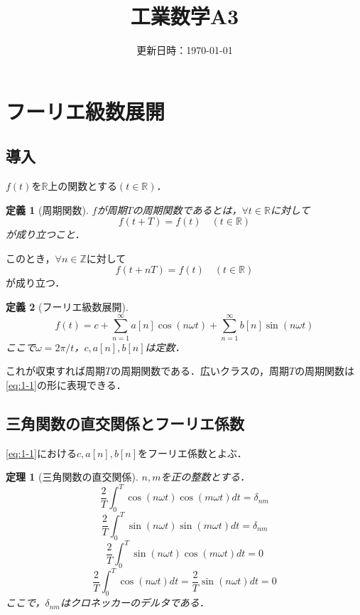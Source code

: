 \documentclass[dvipdfmx,a4j,10pt]{jsarticle}
\title{工業数学A3}
\author{}
\date{更新日時：\today}%
\theoremstyle{mystyle1}
\newtheorem{theorem}[definition]{定理}
\theoremstyle{mystyle3}
\theoremstyle{mystyle4}
\theoremstyle{mystyle2}
\newtheorem{dfn*}{定義}
\newenvironment{thm}[1][]
{\begin{tcolorbox}[
    enhanced,
    boxrule=0pt,
    arc=0mm,
    frame hidden,
    borderline west={2pt}{-4pt}{red},
    breakable = true
    ]
    \begin{theorem}[#1]
}
{\end{theorem}\end{tcolorbox}}
\begin{document}
\maketitle
\tableofcontents%

\newpage

\section{フーリエ級数展開}

\subsection{導入}

$f(t)$を$\mathbb{R}$上の関数とする$(t\in\mathbb{R})$．

\begin{dfn*}[周期関数]
    $f$が周期$T$の周期関数であるとは，$\forall t\in\mathbb{R}$に対して
    \[
        f(t+T)=f(t)\quad(t\in\mathbb{R})
    \]
    が成り立つこと．
\end{dfn*}
このとき，$\forall n\in\mathbb{Z}$に対して
\[
    f(t+nT)=f(t)\quad(t\in\mathbb{R})
\]
が成り立つ．

\begin{dfn*}[フーリエ級数展開]
    \begin{equation}\label{eq:1-1}
        f(t)=c+\sum_{n=1}^\infty a[n]\cos(n\omega t)+\sum_{n=1}^\infty b[n]\sin(n\omega t)
    \end{equation}
    ここで$\omega=2\pi/t$，$c,a[n],b[n]$は定数．
\end{dfn*}

これが収束すれば周期$T$の周期関数である．広いクラスの，周期$T$の周期関数は\eqref{eq:1-1}の形に表現できる．

\subsection{三角関数の直交関係とフーリエ係数}

\eqref{eq:1-1}における$c,a[n],b[n]$をフーリエ係数とよぶ．

\begin{thm}[三角関数の直交関係]\label{thm:1-1}
    $n,m$を正の整数とする．
    \begin{equation}\label{eq:1-2}
        \frac{2}{T}\int_0^T\cos(n\omega t)\cos(m\omega t) dt=\delta_{nm}
    \end{equation}
    \begin{equation}\label{eq:1-3}
        \frac{2}{T}\int_0^T\sin(n\omega t)\sin(m\omega t) dt=\delta_{nm}
    \end{equation}
    \begin{equation}\label{eq:1-4}
        \frac{2}{T}\int_0^T\sin(n\omega t)\cos(m\omega t) dt=0
    \end{equation}
    \begin{equation}\label{eq:1-5}
        \frac{2}{T}\int_0^T\cos(n\omega t) dt=\frac{2}{T}\sin(n\omega t) dt=0
    \end{equation}
    ここで，$\delta_{nm}$はクロネッカーのデルタである．
\end{thm}
\end{document}
